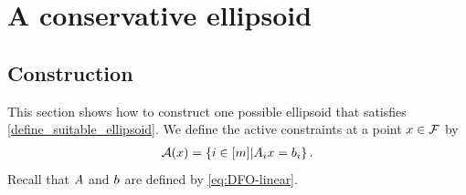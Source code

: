 \documentclass{article}
\begin{document}
\section{A conservative ellipsoid}
\label{sec:ellipsoidal}
%
%



\subsection{Construction}
\label{the_safe_ellipsoid}

This section shows how to construct one possible ellipsoid that satisfies \cref{define_suitable_ellipsoid}.
We define the active constraints at a point $x \in {\mathcal F}$ by
\begin{align}
{\mathcal A}(x) = \left\{i \in [m] | {{A}}_ix = {{b}}_i \right\}. \label{define_activei}
\end{align}
Recall that ${A}$ and ${b}$ are defined by \cref{eq:DFO-linear}.
\end{document}
